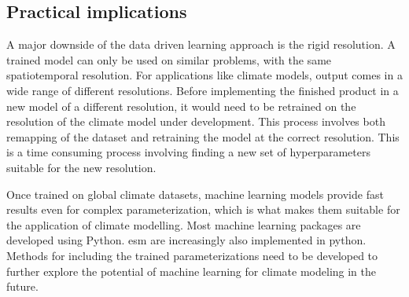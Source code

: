 \subsection{Practical implications} \label{sec:practical_implications}
A major downside of the data driven learning approach is the rigid resolution. A trained model can only be used on similar problems, with the same spatiotemporal resolution. For applications like climate models, output comes in a wide range of different resolutions. Before implementing the finished product in a new model of a different resolution, it would need to be retrained on the resolution of the climate model under development. This process involves both remapping of the dataset and retraining the model at the correct resolution. This is a time consuming process involving finding a new set of hyperparameters suitable for the new resolution. %

Once trained on global climate datasets, machine learning models provide fast results even for complex parameterization, which is what makes them suitable for the application of climate modelling. Most machine learning packages are developed using Python. \acrfull{esm} are increasingly also implemented in python. Methods for including the trained parameterizations need to be developed to further explore the potential of machine learning for climate modeling in the future.
